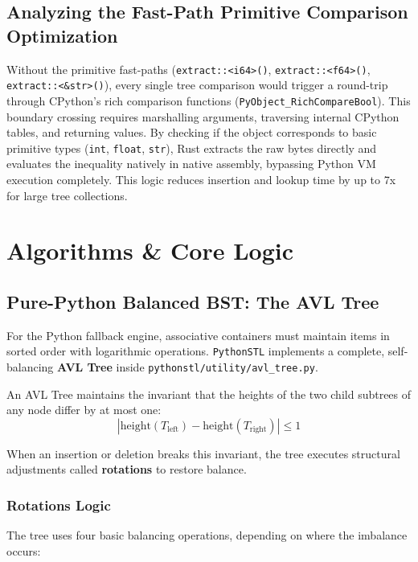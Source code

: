 \documentclass[11pt,a4paper]{article}
\begin{document}
\subsection{Analyzing the Fast-Path Primitive Comparison Optimization}
Without the primitive fast-paths (\texttt{extract::<i64>()}, \texttt{extract::<f64>()}, \texttt{extract::<\&str>()}), every single tree comparison would trigger a round-trip through CPython's rich comparison functions (\texttt{PyObject\_RichCompareBool}). This boundary crossing requires marshalling arguments, traversing internal CPython tables, and returning values. By checking if the object corresponds to basic primitive types (\texttt{int}, \texttt{float}, \texttt{str}), Rust extracts the raw bytes directly and evaluates the inequality natively in native assembly, bypassing Python VM execution completely. This logic reduces insertion and lookup time by up to 7x for large tree collections.

\newpage

\section{Algorithms \& Core Logic}

\subsection{Pure-Python Balanced BST: The AVL Tree}
For the Python fallback engine, associative containers must maintain items in sorted order with logarithmic operations. \texttt{PythonSTL} implements a complete, self-balancing \textbf{AVL Tree} inside \texttt{pythonstl/utility/avl\_tree.py}.

An AVL Tree maintains the invariant that the heights of the two child subtrees of any node differ by at most one:
\begin{equation}
| \text{height}(T_{\text{left}}) - \text{height}(T_{\text{right}}) | \le 1
\end{equation}

When an insertion or deletion breaks this invariant, the tree executes structural adjustments called \textbf{rotations} to restore balance.

\subsubsection{Rotations Logic}
The tree uses four basic balancing operations, depending on where the imbalance occurs:
\end{document}
